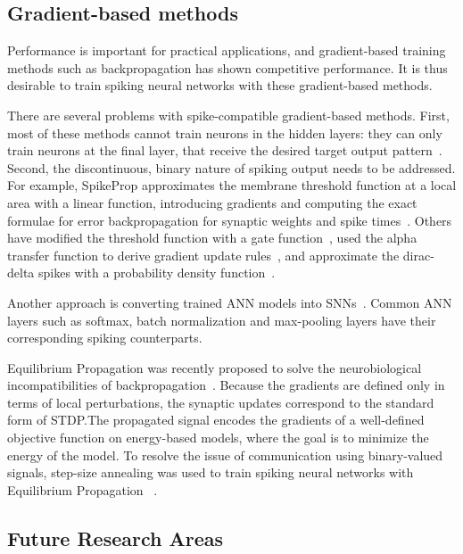 \documentclass[fyp]{socreport}
\begin{document}
\subsection{Gradient-based methods}

Performance is important for practical applications, and gradient-based training
methods such as backpropagation has shown competitive performance. It is thus
desirable to train spiking neural networks with these gradient-based methods.

There are several problems with spike-compatible gradient-based methods. First,
most of these methods cannot train neurons in the hidden layers: they can only
train neurons at the final layer, that receive the desired target output
pattern~\cite{urbanczik09_gradien_learn_rule_tempot,training_deep_snn_bpp_lee}.
Second, the discontinuous, binary nature of spiking output needs to be
addressed. For example, SpikeProp approximates the membrane threshold function
at a local area with a linear function, introducing gradients and computing the
exact formulae for error backpropagation for synaptic weights and spike
times~\cite{spikeprop}. Others have modified the threshold function with a gate
function~\cite{NIPS2018_7417}, used the alpha transfer function to derive
gradient update rules~\cite{comsa19_tempor_codin_spikin_neural_networ}, and
approximate the dirac-delta spikes with a probability density
function~\cite{NIPS2018_7415}.

Another approach is converting trained ANN models into
SNNs~\cite{rueckauer16_theor_tools_conver_analog_to}. Common ANN layers such as
softmax, batch normalization and max-pooling layers have their corresponding
spiking counterparts.

Equilibrium Propagation was recently proposed to solve the neurobiological
incompatibilities of backpropagation~\cite{10.3389/fncom.2017.00024}. Because
the gradients are defined only in terms of local perturbations, the synaptic
updates correspond to the standard form of STDP.\@ The propagated signal encodes
the gradients of a well-defined objective function on energy-based models, where
the goal is to minimize the energy of the model. To resolve the issue of
communication using binary-valued signals, step-size annealing was used to train
spiking neural networks with Equilibrium Propagation
~\cite{pmlr-v89-o-connor19a}.

\subsection{Future Research Areas\label{sec:future-rese-areas}}
\end{document}

